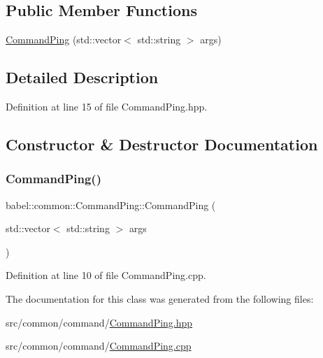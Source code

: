 \subsection*{Public Member Functions}
\begin{DoxyCompactItemize}
\item 
\mbox{\hyperlink{classbabel_1_1common_1_1_command_ping_a4dd78d50fecc0207456b5edb78062580}{Command\+Ping}} (std\+::vector$<$ std\+::string $>$ args)
\end{DoxyCompactItemize}


\subsection{Detailed Description}


Definition at line 15 of file Command\+Ping.\+hpp.



\subsection{Constructor \& Destructor Documentation}
\mbox{\label{classbabel_1_1common_1_1_command_ping_a4dd78d50fecc0207456b5edb78062580}} 
\subsubsection{\texorpdfstring{Command\+Ping()}{CommandPing()}}
{\footnotesize\ttfamily babel\+::common\+::\+Command\+Ping\+::\+Command\+Ping (\begin{DoxyParamCaption}\item[{std\+::vector$<$ std\+::string $>$}]{args }\end{DoxyParamCaption})}



Definition at line 10 of file Command\+Ping.\+cpp.



The documentation for this class was generated from the following files\+:\begin{DoxyCompactItemize}
\item 
src/common/command/\mbox{\hyperlink{_command_ping_8hpp}{Command\+Ping.\+hpp}}\item 
src/common/command/\mbox{\hyperlink{_command_ping_8cpp}{Command\+Ping.\+cpp}}\end{DoxyCompactItemize}
